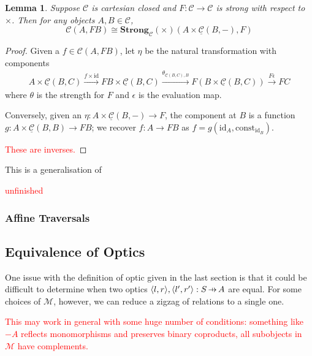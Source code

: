 \documentclass[11pt,a4paper]{article}
\theoremstyle{plain}
\newtheorem{lemma}[theorem]{Lemma}
\theoremstyle{definition}
\newcommand{\C}{\mathscr{C}}
\newcommand{\homC}{\underline{\C}}
\newcommand{\M}{\mathscr{M}}
\newcommand{\Strong}{\mathbf{Strong}}
\newcommand{\id}{\mathrm{id}}
\newcommand{\const}{\mathrm{const}}
\newcommand{\hto}{\ensuremath{\,\mathaccent\shortmid\rightarrow\,}}
\newcommand{\todo}[1]{\textcolor{red}{\small #1}}
\begin{document}
\begin{lemma}
Suppose $\C$ is cartesian closed and $F : \C \to \C$ is strong with respect to $\times$. Then for any objects $A, B \in \C$, \[\C(A, FB) \cong \Strong_\C(\times)(A \times \homC(B, -), F)\]
\end{lemma}
\begin{proof}
Given a $f \in \C(A, FB)$, let $\eta$ be the natural transformation with components
\begin{align*}
A \times \homC(B, C) \xrightarrow{f \times \id} FB \times \homC(B, C) \xrightarrow{\theta_{\homC(B, C), B}}  F(B \times \homC(B, C)) \xrightarrow{F\epsilon} FC
\end{align*}
where $\theta$ is the strength for $F$ and $\epsilon$ is the evaluation map.

Conversely, given an $\eta : A \times \homC(B, -) \to F$, the component at $B$ is a function $g : A \times \homC(B, B) \to FB$; we recover $f : A \to FB$ as $f = g (\id_A, \const_{\id_B})$.

\todo{These are inverses.}
\end{proof}

This is a generalisation of \cite[Proposition 2.2]{SecondOrderFunctionals}

\todo{unfinished}

\subsubsection{Affine Traversals}

\subsection{Equivalence of Optics}

One issue with the definition of optic given in the last section is that it could be difficult to determine when two optics $\langle l, r \rangle, \langle l', r' \rangle : S \hto A$ are equal. For some choices of $\M$, however, we can reduce a zigzag of relations to a single one.

\todo{This may work in general with some huge number of conditions: something like $-A$ reflects monomorphisms and preserves binary coproducts, all subobjects in $\M$ have complements.}
\end{document}
